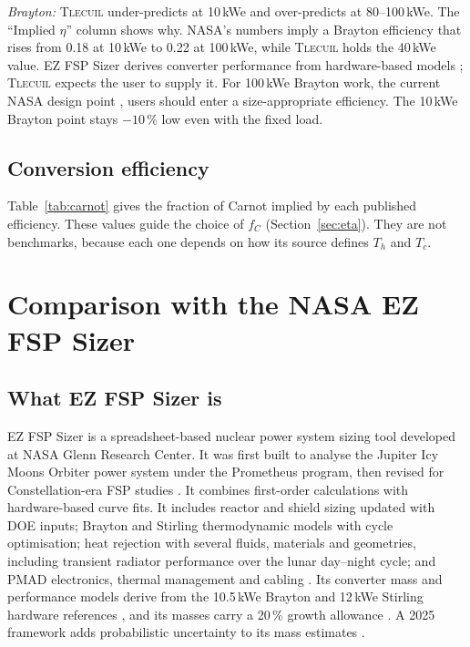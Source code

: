 \documentclass[11pt]{article}
\numberwithin{equation}{section}
\numberwithin{table}{section}
\newcommand{\tlecuil}{\textsc{Tlecuil}}
\begin{document}
\emph{Brayton:} \tlecuil{} under-predicts at 10\,kWe and over-predicts at 80--100\,kWe.
The ``Implied $\eta$'' column shows why. NASA's numbers imply a Brayton efficiency
that rises from 0.18 at 10\,kWe to 0.22 at 100\,kWe, while \tlecuil{} holds the
40\,kWe value. EZ FSP Sizer derives converter performance from hardware-based
models \cite{mason2025trades}; \tlecuil{} expects the user to supply it. For
100\,kWe Brayton work, the current NASA design point \cite{nasa2025fsp,wilson2026dose},
users should enter a size-appropriate efficiency. The 10\,kWe Brayton point stays
$-10\,\%$ low even with the fixed load.

\subsection{Conversion efficiency}
Table~\ref{tab:carnot} gives the fraction of Carnot implied by each published
efficiency. These values guide the choice of $f_C$ (Section~\ref{sec:eta}). They are not
benchmarks, because each one depends on how its source defines $T_h$ and $T_c$.
\tablecarnot
\FloatBarrier

\section{Comparison with the NASA EZ FSP Sizer}\label{sec:ez}

\subsection{What EZ FSP Sizer is}
EZ FSP Sizer is a spreadsheet-based nuclear power system sizing tool developed at
NASA Glenn Research Center. It was first built to analyse the Jupiter Icy Moons
Orbiter power system under the Prometheus program, then revised for
Constellation-era FSP studies \cite{mason2025trades,charoenboonvivat2025uq}. It
combines first-order calculations with hardware-based curve fits. It includes
reactor and shield sizing updated with DOE inputs; Brayton and Stirling
thermodynamic models with cycle optimisation; heat rejection with several fluids,
materials and geometries, including transient radiator performance over the lunar
day--night cycle; and PMAD electronics, thermal management and cabling
\cite{mason2025trades}. Its converter mass and performance models derive from the
10.5\,kWe Brayton and 12\,kWe Stirling hardware references \cite{mason2025trades}, and
its masses carry a 20\,\% growth allowance \cite{charoenboonvivat2025uq}. A 2025
framework adds probabilistic uncertainty to its mass estimates
\cite{charoenboonvivat2025uq}.
\end{document}
